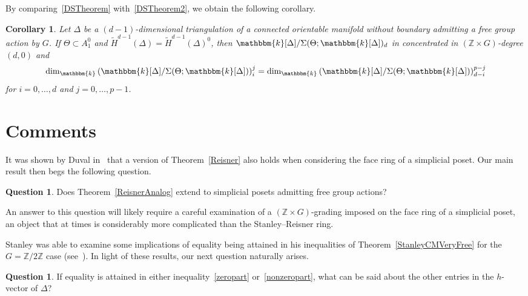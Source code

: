 \documentclass[10pt]{amsart}
\newtheorem{coro}[theo]{Corollary}
\theoremstyle{definition}
\newtheorem{question}[theo]{Question}
\newcommand{\field}{\mathbbm{k}}
\newcommand{\ZZ}{{\mathbb Z}}
\begin{document}
By comparing~\ref{DSTheorem} with~\ref{DSTheorem2}, we obtain the following corollary.

\begin{coro}
Let $\Delta$ be a $(d-1)$-dimensional triangulation of a connected orientable manifold without boundary admitting a free group action by $G$. If $\Theta\subset A_1^0$ and $\widetilde{H}^{d-1}(\Delta)=\widetilde{H}^{d-1}(\Delta)^0$, then $\field[\Delta]/\Sigma(\Theta;\field[\Delta])_d$ in concentrated in $(\ZZ\times G)$-degree $(d, 0)$ and
\[
\dim_\field \left(\field[\Delta]/\Sigma(\Theta;\field[\Delta])\right)_i^j = \dim_\field \left(\field[\Delta]/\Sigma(\Theta;\field[\Delta])\right)_{d-i}^{p-j}
\]
for $i=0, \ldots, d$ and $j=0, \ldots, p-1$.
\end{coro}


\section{Comments}\label{comments}

It was shown by Duval in~\cite{Duval} that a version of Theorem~\ref{Reisner} also holds when considering the face ring of a simplicial poset. Our main result then begs the following question.

\begin{question}
Does Theorem~\ref{ReisnerAnalog} extend to simplicial posets admitting free group actions?
\end{question}

An answer to this question will likely require a careful examination of a $(\ZZ\times G)$-grading imposed on the face ring of a simplicial poset, an object that at times is considerably more complicated than the Stanley--Reisner ring.

Stanley was able to examine some implications of equality being attained in his inequalities of Theorem~\ref{StanleyCMVeryFree} for the $G=\ZZ/2\ZZ$ case (see~\cite[Proposition~III.8.2]{St-96}). In light of these results, our next question naturally arises.

\begin{question}
If equality is attained in either inequality~\eqref{zeropart} or~\eqref{nonzeropart}, what can be said about the other entries in the $h$-vector of $\Delta$?
\end{question}
\end{document}
